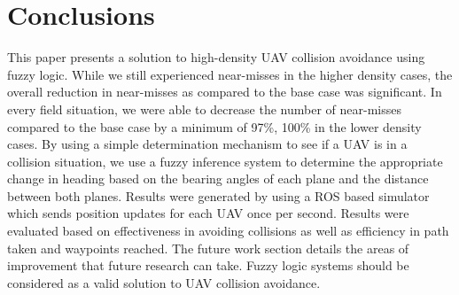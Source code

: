 \documentclass[10pt, conference, compsocconf]{IEEEtran}
\begin{document}
\section{Conclusions}
This paper presents a solution to high-density UAV collision avoidance using fuzzy logic.  While we still experienced near-misses in the higher density cases, the overall reduction in near-misses as compared to the base case was significant.  In every field situation, we were able to decrease the number of near-misses compared to the base case by a minimum of 97\%,  100\% in the lower density cases.  By using a simple determination mechanism to see if a UAV is in a collision situation, we use a fuzzy inference system to determine the appropriate change in heading based on the bearing angles of each plane and the distance between both planes.  Results were generated by using a ROS based simulator which sends position updates for each UAV once per second.  Results were evaluated based on effectiveness in avoiding collisions as well as efficiency in path taken and waypoints reached.  The future work section details the areas of improvement that future research can take.  Fuzzy logic systems should be considered as a valid solution to UAV collision avoidance. 

%
\end{document}
